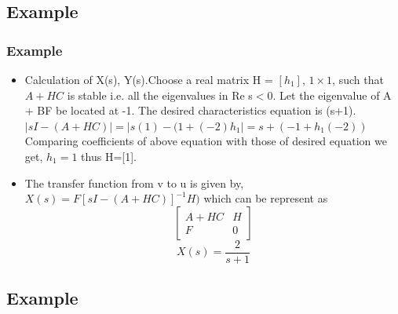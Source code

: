 \documentclass{beamer}
\begin{document}
\subsection*{Example}

\begin{frame}
\frametitle{Example}
\begin{small}

        \begin{itemize}
      \item Calculation of X(s), Y(s).Choose a real matrix H = $[h_1]$, $ 1 \times 1$, such that $A + HC$ is stable i.e. all the eigenvalues in Re s$<$0. Let the eigenvalue of A + BF be located at -1. The desired characteristics equation is (s+1).\\
               $|sI-(A+HC)| =|s(1)-(1+(-2)h_1|=s+(-1+h_1(-2))$\\
Comparing coefficients of above equation with those of desired equation we get, $h_1=1$ thus H=[1].\\
\item The transfer function from v to u is given by,\\
 $X(s)=F[sI-(A+HC)]^{-1}H)$ which can be represent as 
\[ \left[ \begin{array}{c|c}
A+HC& H \\
\hline
F & 0 \end{array} \right]\] 
\begin{equation}
X(s)=\frac{2}{s+1}
\end{equation}
\end{itemize}
\end{small}
\end{frame}





\subsection*{Example}
\end{document}
